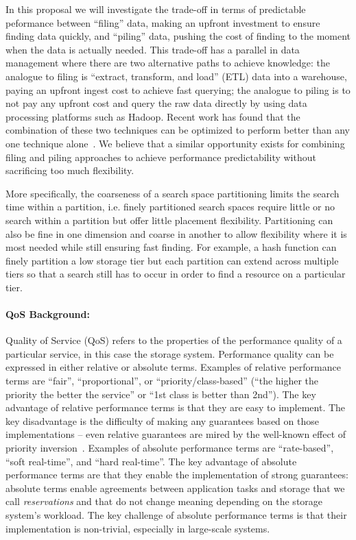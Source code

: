 In this proposal we will investigate the trade-off in terms of predictable peformance between ``filing'' data, making an upfront investment to ensure finding data quickly, and ``piling'' data, pushing the cost of finding to the moment when the data is actually needed. This trade-off has a parallel in data management where there are two alternative paths to achieve knowledge: the analogue to filing is ``extract, transform, and load'' (ETL) data into a warehouse, paying an upfront ingest cost to achieve fast querying; the analogue to piling is to not pay any upfront cost and query the raw data directly by using data processing platforms such as Hadoop. Recent work has found that the combination of these two techniques can be optimized to perform better than any one technique alone~\cite{lefevre:sigmod14a}. We believe that a similar opportunity exists for combining filing and piling approaches to achieve performance predictability without sacrificing too much flexibility.

More specifically, the coarseness of a search space partitioning limits the search time within a partition, i.e. finely partitioned search spaces require little or no search within a partition but offer little placement flexibility. Partitioning can also be fine in one dimension and coarse in another to allow flexibility where it is most needed while still ensuring fast finding. For example, a hash function can finely partition a low storage tier but each partition can extend across multiple tiers so that a search still has to occur in order to find a resource on a particular tier. 

\paragraph{QoS Background:} 
Quality of Service (QoS) refers to the
properties of the performance quality of a particular service, in
this case the storage system.
Performance quality can be expressed in either relative or absolute
terms. Examples of relative performance terms are ``fair'',
``proportional'', or ``priority/class-based'' (``the higher the
priority the better the service'' or ``1st class is better than
2nd''). The key advantage of relative performance terms is that
they are easy to implement. The key disadvantage is the difficulty
of making any guarantees based on those implementations --
even relative guarantees are mired by the well-known effect of
priority inversion~\cite{lampson:cacm80}. Examples of absolute
performance terms are ``rate-based'', ``soft real-time'', and
``hard real-time''. The key advantage of absolute performance
terms are that they enable the implementation of strong
guarantees: absolute terms enable agreements between application
tasks and storage that we call \emph{reservations} and that do not
change meaning depending
on the storage system's workload. The key challenge of absolute
performance terms is that their implementation is non-trivial,
especially in large-scale systems.

